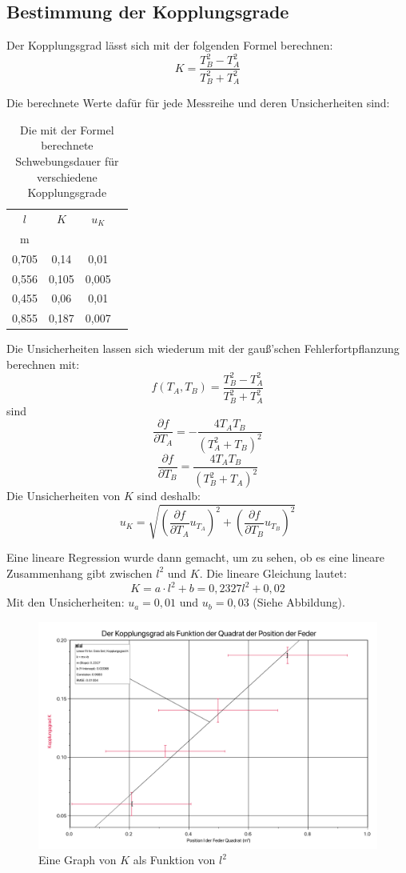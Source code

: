 \documentclass[11pt,a4paper]{article}
\begin{document}
\subsection{Bestimmung der Kopplungsgrade}
Der Kopplungsgrad lässt sich mit der folgenden Formel berechnen:
\begin{equation}
K = \frac{T_B^2-T_A^2}{T_B^2+T_A^2}
\end{equation}

Die berechnete Werte dafür für jede Messreihe und deren Unsicherheiten sind:

\begin{table}[h]
	\centering
	\begin{tabular*}{0.99\textwidth}{@{\extracolsep{\fill}}cccc}
		\toprule
		$l$ & $K$ & $u_{K}$  \\
		m &  &    \\
		\bottomrule
		0,705 & 0,14 & 0,01 \\
		0,556 & 0,105 & 0,005 \\
		0,455 & 0,06 & 0,01 \\
		0,855 & 0,187 & 0,007 \\
		\bottomrule
	\end{tabular*}
	\caption{Die mit der Formel berechnete Schwebungsdauer für verschiedene Kopplungsgrade}
	\label{tabelle}
\end{table}

Die Unsicherheiten lassen sich wiederum mit der gauß'schen Fehlerfortpflanzung berechnen mit:
$$f(T_A,T_B) = \frac{T_B^2-T_A^2}{T_B^2+T_A^2}$$
sind
$$\frac{\partial f}{\partial T_A} = -\frac{4T_A T_B}{(T_A^2+T_B)^2}$$
$$\frac{\partial f}{\partial T_B} = \frac{4T_A T_B}{(T_B^2+T_A)^2}$$
Die Unsicherheiten von $K$ sind deshalb:
$$u_{K} = \sqrt{(\frac{\partial f}{\partial T_A}u_{T_A})^2+(\frac{\partial f}{\partial T_B}u_{T_B})^2}$$

Eine lineare Regression wurde dann gemacht, um zu sehen, ob es eine lineare Zusammenhang gibt zwischen $l^2$ und $K$. Die lineare Gleichung lautet:
$$ K = a\cdot l^2 +b = 0,2327 l^2 + 0,02 $$
Mit den Unsicherheiten: $u_a = 0,01$ und $u_b = 0,03$ (Siehe Abbildung). 
\begin{figure}[h]
	\centering
	\includegraphics[width=\textwidth]{Abb2}
	\caption{Eine Graph von $K$ als Funktion von $l^2$}
\end{figure}
\end{document}
